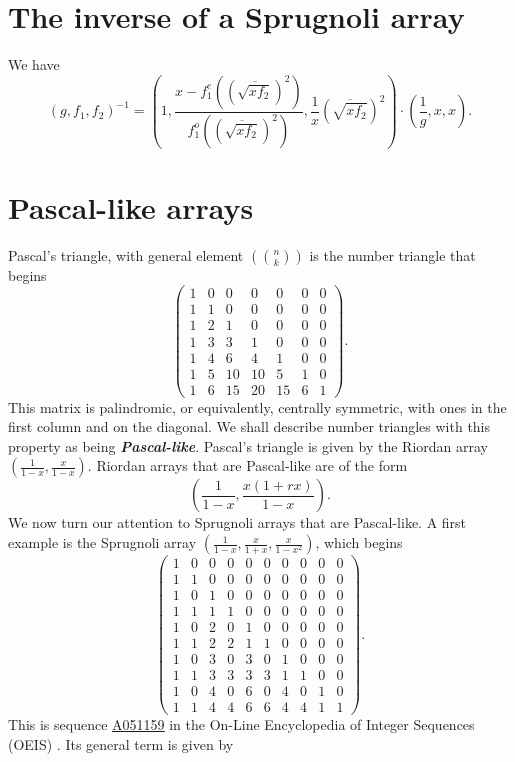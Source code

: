 \documentclass[12pt,reqno]{article}
\theoremstyle{definition}
\newcommand{\seqnum}[1]{\href{http://oeis.org/#1}{\underline{#1}}}
\begin{document}
\section{The inverse of a Sprugnoli array}

We have
$$(g,f_1,f_2)^{-1}=\left(1,\frac{x-f_1^e(\left(\overline{\sqrt{xf_2}}\right)^2)}{f_1^o(\left(\overline{\sqrt{xf_2}}\right)^2)},\frac{1}{x}\left(\overline{\sqrt{xf_2}}\right)^2\right)\cdot \left(\frac{1}{g},x,x\right).$$

\section{Pascal-like arrays}
Pascal's triangle, with general element $\left(\binom{n}{k}\right)$ is the number triangle that begins
$$\left(\begin{array}{ccccccc}
1 & 0 & 0 & 0 & 0 & 0 & 0 \\
1 & 1 & 0 & 0 & 0 & 0 & 0 \\
1 & 2 & 1 & 0 & 0 & 0 & 0 \\
1 & 3 & 3 & 1 & 0 & 0 & 0 \\
1 & 4 & 6 & 4 & 1 & 0 & 0 \\
1 & 5 & 10 & 10 & 5 & 1 & 0 \\
1 & 6 & 15 & 20 & 15 & 6 & 1
\end{array}\right).$$ This matrix is palindromic, or equivalently, centrally symmetric, with ones in the first column and on the diagonal. We shall describe number triangles with this property as being \textbf{\emph{Pascal-like}}. Pascal's triangle is given by the Riordan array $\left(\frac{1}{1-x}, \frac{x}{1-x}\right)$. Riordan arrays that are Pascal-like are of the form \cite{Intcon}
$$\left(\frac{1}{1-x}, \frac{x(1+rx)}{1-x}\right).$$ We now turn our attention to Sprugnoli arrays that are Pascal-like. A first example is the Sprugnoli array $\left(\frac{1}{1-x}, \frac{x}{1+x}, \frac{x}{1-x^2}\right)$, which begins
$$\left(\begin{array}{cccccccccc}
1 & 0 & 0 & 0 & 0 & 0 & 0 & 0 & 0 & 0 \\
1 & 1 & 0 & 0 & 0 & 0 & 0 & 0 & 0 & 0 \\
1 & 0 & 1 & 0 & 0 & 0 & 0 & 0 & 0 & 0 \\
1 & 1 & 1 & 1 & 0 & 0 & 0 & 0 & 0 & 0 \\
1 & 0 & 2 & 0 & 1 & 0 & 0 & 0 & 0 & 0 \\
1 & 1 & 2 & 2 & 1 & 1 & 0 & 0 & 0 & 0 \\
1 & 0 & 3 & 0 & 3 & 0 & 1 & 0 & 0 & 0 \\
1 & 1 & 3 & 3 & 3 & 3 & 1 & 1 & 0 & 0 \\
1 & 0 & 4 & 0 & 6 & 0 & 4 & 0 & 1 & 0 \\
1 & 1 & 4 & 4 & 6 & 6 & 4 & 4 & 1 & 1
\end{array}\right).$$ This is sequence \seqnum{A051159} in the On-Line Encyclopedia of Integer Sequences (OEIS) \cite{SL1, SL2}. Its general term is given by
\end{document}
